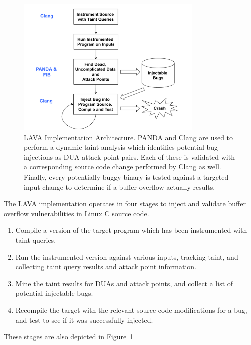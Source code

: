 
\begin{figure}
\centering
\includegraphics[width=3.5in]{lava-arch.pdf}
\caption{LAVA Implementation Architecture.  PANDA and Clang  are used to perform a dynamic taint analysis which identifies potential bug injections as DUA attack point pairs.
Each of these is validated with a corresponding source code change performed by Clang  as well.
Finally, every potentially buggy binary is tested against a targeted input change to determine if a buffer overflow actually results.}
\label{fig:lava-impl}
\end{figure}


The LAVA implementation operates in four stages to inject and validate buffer overflow vulnerabilities in Linux C source code. 

\begin{enumerate}
\item Compile a version of the target program which has been instrumented with taint queries.
\item Run the instrumented version against various inputs, tracking taint, and collecting taint query results and attack point information.
\item Mine the taint results for DUAs and attack points, and collect a list of potential injectable bugs.
\item Recompile the target with the relevant source code modifications for a bug, and test to see if it was successfully injected.
\end{enumerate}

These stages are also depicted in Figure~\ref{fig:lava-impl}

